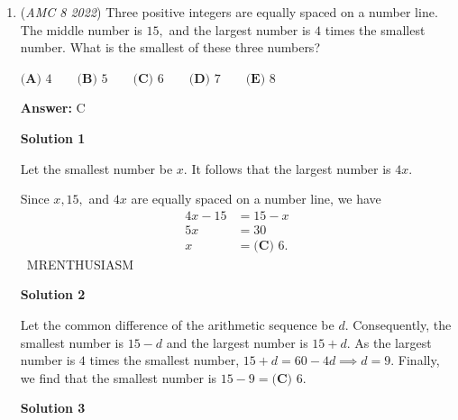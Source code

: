 \begin{enumerate}
\textbf{Solution 2}

We assume that

 a)the current age of Anna = a

 b) the current age of Bella = b

 b-5=6

 Thus, b = 11 

 Kitten = 5 (as the it got it 5 years ago)

 Since the total age of kitten and girls = 30, 

 then a = 30-(11+5)

 =30 - 16

 =14 years.

 BUT THIS IS NOT THE FINAL ANSWER!!!

 a-b = 14-11 = 3 = option C

 


	\item (\textit{AMC 8 2022}) Three positive integers are equally spaced on a number line. The middle number is $15,$ and the largest number is $4$ times the smallest number. What is the smallest of these three numbers? 


 $\textbf{(A) } 4 \qquad \textbf{(B) } 5 \qquad \textbf{(C) } 6 \qquad \textbf{(D) } 7 \qquad \textbf{(E) } 8$

 \textbf{Answer: }C



\textbf{Solution 1}

Let the smallest number be $x.$ It follows that the largest number is $4x.$

 Since $x,15,$ and $4x$ are equally spaced on a number line, we have
 \begin{align*} 4x-15 &= 15-x \\ 5x &= 30 \\ x &= \boxed{\textbf{(C) } 6}. \end{align*}
~MRENTHUSIASM

 



\textbf{Solution 2}

Let the common difference of the arithmetic sequence be $d$. Consequently, the smallest number is $15-d$ and the largest number is $15+d$. As the largest number is $4$ times the smallest number, $15+d=60-4d\implies d=9$. Finally, we find that the smallest number is $15-9=\boxed{\textbf{(C) } 6}$.

 



\textbf{Solution 3}


\end{enumerate}
